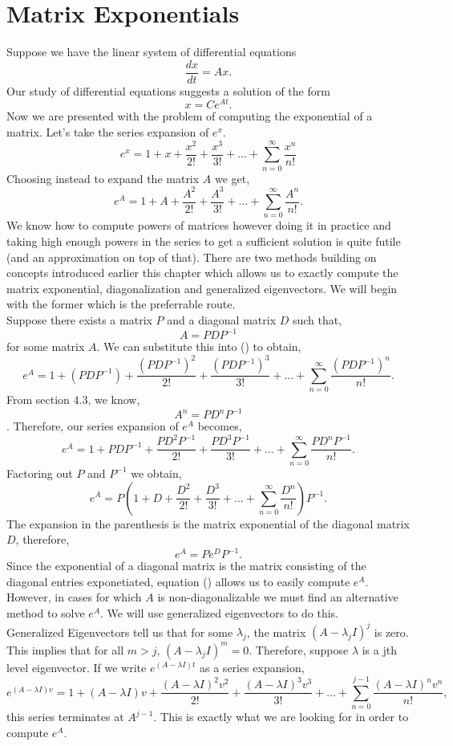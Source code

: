 \section{Matrix Exponentials}
\noindent Suppose we have the linear system of differential equations 
\[\frac{dx}{dt} = Ax.\]
Our study of differential equations suggests a solution of the form 
\[x = Ce^{At}.\]
Now we are presented with the problem of computing the exponential of a matrix. 
Let's take the series expansion of $e^x$.
\[e^x = 1 + x + \frac{x^2}{2!} + \frac{x^3}{3!} + ... + \sum_{n=0}^{\infty}\frac{x^n}{n!}\]  
Choosing instead to expand the matrix $A$ we get,
\[e^A = 1 + A + \frac{A^2}{2!} + \frac{A^3}{3!} + ... + \sum_{n=0}^{\infty}\frac{A^n}{n!}.\] 
We know how to compute powers of matrices however doing it in practice and taking high enough powers in the series to get a sufficient solution is quite futile (and an approximation on top of that). 
There are two methods building on concepts introduced earlier this chapter which allows us to exactly compute the matrix exponential, diagonalization and generalized eigenvectors. 
We will begin with the former which is the preferrable route. \\
\newline
Suppose there exists a matrix $P$ and a diagonal matrix $D$ such that,
\[A = PDP^{-1}\]
for some matrix $A$.
We can substitute this into () to obtain,
\[e^A = 1 + (PDP^{-1}) + \frac{(PDP^{-1})^2}{2!} + \frac{(PDP^{-1})^3}{3!} + ... + \sum_{n=0}^{\infty}\frac{(PDP^{-1})^n}{n!}.\]
From section 4.3, we know,
\[A^n = PD^nP^{-1}\].
Therefore, our series expansion of $e^A$ becomes,
\[e^A = 1 + PDP^{-1} + \frac{PD^2P^{-1}}{2!} + \frac{PD^3P^{-1}}{3!} + ... + \sum_{n=0}^{\infty}\frac{PD^nP^{-1}}{n!}.\]
Factoring out $P$ and $P^{-1}$ we obtain,
\[e^A = P(1 + D + \frac{D^2}{2!} + \frac{D^3}{3!} + ... + \sum_{n=0}^{\infty} \frac{D^n}{n!})P^{-1}. \]
The expansion in the parenthesis is the matrix exponential of the diagonal matrix $D$, therefore,
\[e^A = Pe^DP^{-1}.\] 
Since the exponential of a diagonal matrix is the matrix consisting of the diagonal entries exponetiated, equation () allows us to easily compute $e^A$. \\
\newline
However, in cases for which $A$ is non-diagonalizable we must find an alternative method to solve $e^A$.
We will use generalized eigenvectors to do this. \\
Generalized Eigenvectors tell us that for some $\lambda_j$, the matrix $(A-\lambda_j I)^j$ is zero. 
This implies that for all $m > j$, $(A-\lambda_j I)^m = 0$. 
Therefore, suppose $\lambda$ is a jth level eigenvector. If we write $e^{(A-\lambda I)t}$ as a series expansion,
\[e^{(A-\lambda I)v} = 1 + (A-\lambda I)v + \frac{(A-\lambda I)^2v^2}{2!} + \frac{(A-\lambda I)^3v^3}{3!} + ... + \sum_{n=0}^{j-1}\frac{(A-\lambda I)^nv^n}{n!},\]
this series terminates at $A^{j-1}$.
This is exactly what we are looking for in order to compute $e^A$.





